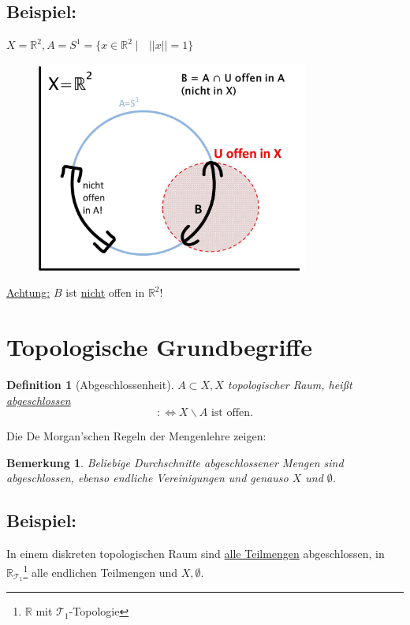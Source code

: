 \documentclass[a4paper,11pt,notitlepage]{report}
\newtheorem{definition}{Definition}[chapter]
\newtheorem{remark}{Bemerkung}[chapter]
\newcommand{\R}{{\ensuremath{\mathbb{R}}}}
\newenvironment{bsp}[1]
{
\setlength{\fboxsep}{10pt}
\subsection*{Beispiel: #1}
\begin{upshape}
}
{
\end{upshape}
}
\begin{document}
\begin{bsp}{}
$X = \R^2, A = S^1 = \{ x \in \R^2 \mid \text{ } ||x|| = 1\}$ 
\newline
\begin{figure}[h]
\centering
\includegraphics[width=0.8\textwidth]{images/Teilraumtopologie.jpg}
\end{figure}
\newline
\underline{Achtung:} $B$ ist \underline{\underline{nicht}} offen in $\R^2$!
\end{bsp}

\section{Topologische Grundbegriffe}

\begin{definition}[Abgeschlossenheit]
	$A \subset X, X$ topologischer Raum, heißt \underline{abgeschlossen} $$:\Leftrightarrow X \backslash A \text{ ist offen.}$$
\end{definition}

Die De Morgan'schen Regeln der Mengenlehre zeigen:

\begin{remark}
	Beliebige Durchschnitte abgeschlossener Mengen sind abgeschlossen, ebenso endliche Vereinigungen und genauso $X$ und $\emptyset$.
\end{remark}

\begin{bsp}{}
	In einem diskreten topologischen Raum sind \underline{alle Teilmengen} abgeschlossen, in $\R_{\mathcal{T}_1}$\footnote{$\R$ mit $\mathcal{T}_1$-Topologie} alle endlichen Teilmengen und $X, \emptyset$.
\end{bsp}
\end{document}
